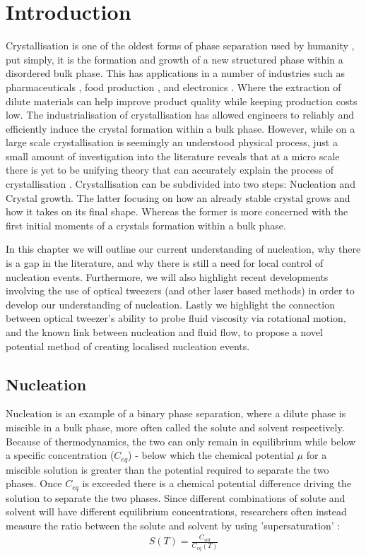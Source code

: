 \chapter{Introduction}
Crystallisation is one of the oldest forms of phase 
separation used by humanity \cite{Schoen1956}, put 
simply, it is the formation and growth of a new 
structured phase within a disordered bulk phase. 
This has applications in a number of industries such 
as pharmaceuticals \cite{Gao2017}, food production 
\cite{Hartel2002}, and electronics \cite{Myerson2002}. 
Where the extraction of dilute materials can help 
improve product quality while keeping production costs 
low. The industrialisation of crystallisation has 
allowed engineers to reliably and efficiently induce 
the crystal formation within a bulk phase. However, 
while on a large scale crystallisation is seemingly an 
understood physical process, just a small amount of 
investigation into the literature reveals that at a 
micro scale there is yet to be unifying theory that can 
accurately explain the process of crystallisation 
\cite{Fu2021}. Crystallisation can be subdivided into 
two steps: Nucleation and Crystal growth. The latter 
focusing on how an already stable crystal grows and how 
it takes on its final shape. Whereas the former is more 
concerned with the first initial moments of a crystals 
formation within a bulk phase.

In this chapter we will outline our current understanding 
of nucleation, why there is a gap in the literature, and why 
there is still a need for local control of nucleation events. 
Furthermore, we will also highlight recent developments 
involving the use of optical tweezers (and other laser based 
methods) in order to develop our understanding of nucleation. 
Lastly we highlight the connection between optical tweezer's 
ability to probe fluid viscosity via rotational motion, and 
the known link between nucleation and fluid flow, to propose 
a novel potential method of creating localised nucleation events.
 
\section{Nucleation}
Nucleation is an example of a binary phase separation, 
where a dilute phase is miscible in a bulk phase, more 
often called the solute and solvent respectively. Because 
of thermodynamics, the two can only remain in equilibrium 
while below a specific concentration ($C_{eq}$) - below 
which the chemical potential $\mu$ for a miscible solution 
is greater than the potential required to separate the two 
phases. Once $C_{eq}$ is exceeded there is a chemical potential 
difference driving the solution to separate the two phases. 
Since different combinations of solute and solvent will 
have different equilibrium concentrations, researchers often 
instead measure the ratio between the solute and solvent by 
using 'supersaturation' \cite{Mullin2001}:
\begin{align}
	\label{eq:supersaturation}
	S(T) = \frac{C_{sol}}{C_{eq}(T)}
\end{align}

